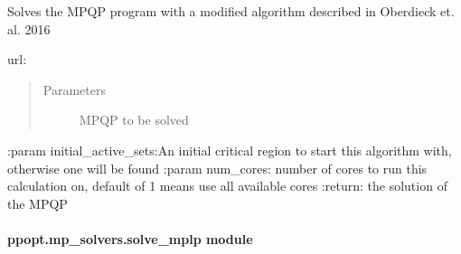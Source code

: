 \documentclass[letterpaper,10pt,english]{sphinxmanual}
\begin{document}
\begin{fulllineitems}
\label{\detokenize{ppopt.mp_solvers:ppopt.mp_solvers.mpqp_parrallel_graph.solve_no_murder}}
\sphinxAtStartPar
Solves the MPQP program with a modified algorithm described in Oberdieck et. al. 2016

\sphinxAtStartPar
url: 
\begin{quote}\begin{description}
\item[{Parameters}] \leavevmode
\sphinxAtStartPar
{} \textendash{} MPQP to be solved

\end{description}\end{quote}

\sphinxAtStartPar
:param initial\_active\_sets:An initial critical region to start this algorithm with, otherwise one will be found
:param num\_cores: number of cores to run this calculation on, default of \sphinxhyphen{}1 means use all available cores
:return: the solution of the MPQP

\end{fulllineitems}



\paragraph{ppopt.mp\_solvers.solve\_mplp module}
\label{\detokenize{ppopt.mp_solvers:module-ppopt.mp_solvers.solve_mplp}}\label{\detokenize{ppopt.mp_solvers:ppopt-mp-solvers-solve-mplp-module}}
\end{document}
